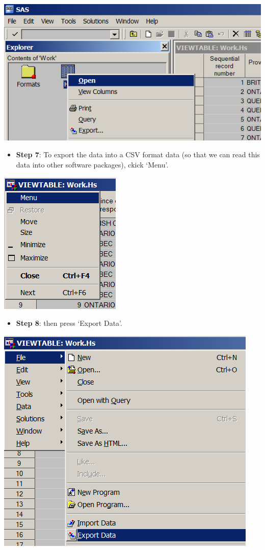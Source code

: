 \documentclass[
]{book}
\providecommand{\tightlist}{%
  \setlength{\itemsep}{0pt}\setlength{\parskip}{0pt}}
\begin{document}
\includegraphics[width=0.65\linewidth]{images/abacus19}

\begin{itemize}
\tightlist
\item
  \textbf{Step 7}: To export the data into a CSV format data (so that we can read this data into other software packages), ckick `Menu'.
\end{itemize}

\includegraphics[width=0.65\linewidth]{images/abacus20}

\begin{itemize}
\tightlist
\item
  \textbf{Step 8}: then press `Export Data'.
\end{itemize}

\includegraphics[width=0.65\linewidth]{images/abacus21}
\end{document}
